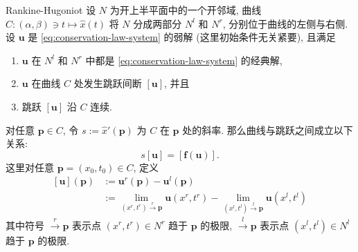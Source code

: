 \begin{Theorem}{Rankine-Hugoniot}
\label{thm:rankine-hugoniot}
设 $N$ 为开上半平面中的一个开邻域, 曲线 $C:(\alpha,\beta)\ni t\mapsto\hat x(t)$ 将 $N$ 分成两部分 $N^l$ 和 $N^r$, 分别位于曲线的左侧与右侧. 设 $\bm{u}$ 是 \eqref{eq:conservation-law-system} 的弱解 (这里初始条件无关紧要), 且满足
\begin{enumerate}
\item $\bm{u}$ 在 $N^l$ 和 $N^r$ 中都是 \eqref{eq:conservation-law-system} 的经典解,
\item $\bm{u}$ 在曲线 $C$ 处发生跳跃间断 $[\bm{u}]$, 并且
\item 跳跃 $[\bm{u}]$ 沿 $C$ 连续.
\end{enumerate}
对任意 $\bm{p}\in C$, 令 $s:=\hat x'(\bm{p})$ 为 $C$ 在 $\bm{p}$ 处的斜率. 那么曲线与跳跃之间成立以下关系:
\begin{equation}\label{eq:rankine-hugoniot-jump-condition}
s[\bm{u}]=[\bm{f}(\bm{u})].
\end{equation}
这里对任意 $\bm{p}=(x_0,t_0)\in C$, 定义
\begin{equation}\label{eq:conservation-jump-definition}
\begin{aligned}
[\bm{u}](\bm{p})&:=\bm{u}^r(\bm{p})-\bm{u}^l(\bm{p})\\
&:=\lim_{(x^r,t^r)\xrightarrow{r}\bm{p}}\bm{u}(x^r,t^r)-\lim_{(x^l,t^l)\xrightarrow{l}\bm{p}}\bm{u}(x^l,t^l)
\end{aligned}
\end{equation}
其中符号 $\xrightarrow{r}\bm{p}$ 表示点 $(x^r,t^r)\in N^r$ 趋于 $\bm{p}$ 的极限, $\xrightarrow{l}\bm{p}$ 表示点 $(x^l,t^l)\in N^l$ 趋于 $\bm{p}$ 的极限.
\end{Theorem}

